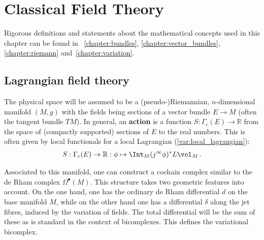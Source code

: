 \chapter{Classical Field Theory}\label{chapter:classical_fields}

    Rigorous definitions and statements about the mathematical concepts used in this chapter can be found in ~\ref{chapter:bundles}, \ref{chapter:vector_bundles}, \ref{chapter:riemann} and~\ref{chapter:variation}.

    \minitoc

\section{Lagrangian field theory}

    The physical space will be assumed to be a (pseudo-)Riemannian, $n$-dimensional manifold $(M,g)$ with the fields being sections of a vector bundle $E\rightarrow M$ (often the tangent bundle $TM$). In general, an \textbf{action} is a function $S:\Gamma_c(E)\rightarrow\mathbb{R}$ from the space of (compactly supported) sections of $E$ to the real numbers. This is often given by local functionals for a local Lagrangian (\cref{var:local_lagrangian}):
    \begin{gather}
        S:\Gamma_c(E)\rightarrow\mathbb{R}:\phi\mapsto\Int_M(j^\infty\phi)^*L\vol_M\,.
    \end{gather}

    Associated to this manifold, one can construct a cochain complex similar to the de Rham complex $\Omega^\bullet(M)$. This structure takes two geometric features into account. On the one hand, one has the ordinary de Rham differential $d$ on the base manifold $M$, while on the other hand one has a differential $\delta$ along the jet fibres, induced by the variation of fields. The total differential will be the sum of these as is standard in the context of bicomplexes. This defines the variational bicomplex.

